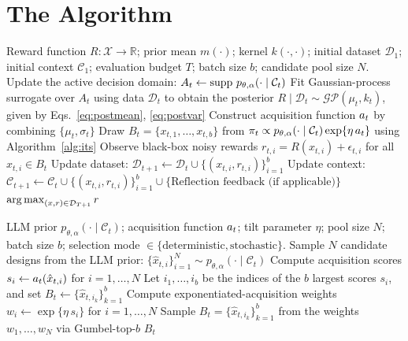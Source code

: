 \section{The Algorithm}
\label{sec:algo}

\begin{algorithm}[t]
\caption{The Large Discovery Model Loop}
\label{alg:ldm_sequential}
\begin{algorithmic}[1]
\Require Reward function $R:\mathcal{X}\to\mathbb{R}$; prior mean $m(\cdot)$; kernel $k(\cdot,\cdot)$; initial dataset $\mathcal{D}_1$; initial context $\mathcal{C}_1$; evaluation budget $T$; batch size $b$; candidate pool size $N$.
  \State Update the active decision domain: $A_t \gets \operatorname{supp}\,p_{\theta,\alpha}(\cdot\mid\mathcal{C}_t)$
  \State Fit Gaussian-process surrogate over $A_t$ using data $\mathcal{D}_t$ to obtain the posterior $R \mid \mathcal{D}_t \sim \mathcal{GP}(\mu_t, k_t)$, given by Eqs.~\eqref{eq:postmean}, \eqref{eq:postvar} 
  \State Construct acquisition function $a_t$ by combining $\{\mu_t, \sigma_t\}$ 
  \State Draw $B_t = \{x_{t,1},\dots,x_{t,b}\}$ from $\pi_t \propto p_{\theta,\alpha}(\cdot\mid\mathcal{C}_t)\exp\{\eta\,a_t\}$ using Algorithm~\ref{alg:its}
  \State Observe black-box noisy rewards $r_{t,i} = R(x_{t,i}) + \epsilon_{t,i}$ for all $x_{t,i} \in B_t$
  \State Update dataset: $\mathcal{D}_{t+1} \gets \mathcal{D}_t \cup \{(x_{t,i}, r_{t,i})\}_{i=1}^b$
  \State Update context: $\mathcal{C}_{t+1} \gets \mathcal{C}_t \cup \{(x_{t,i}, r_{t,i})\}_{i=1}^b \cup \{\text{Reflection feedback (if applicable)}\}$
\EndFor
\State \Return $\operatorname*{arg\,max}_{(x,r) \in \mathcal{D}_{T+1}} r$
\end{algorithmic}
\end{algorithm}

\begin{algorithm}[t]
\caption{Acquisition-Guided Inference-time Sampling}
\label{alg:its}
\begin{algorithmic}[1]
\Require LLM prior $p_{\theta,\alpha}(\cdot \mid \mathcal{C}_t)$; acquisition function $a_t$; tilt parameter $\eta$; pool size $N$; batch size $b$; selection mode $\in \{\text{deterministic}, \text{stochastic}\}$.
\State Sample $N$ candidate designs from the LLM prior: $\{\hat{x}_{t,i}\}_{i=1}^N \sim p_{\theta, \alpha}(\cdot \mid \mathcal{C}_t)$
\State Compute acquisition scores $s_i \gets a_t(\hat{x}_{t,i})$ for $i=1,\dots,N$
  \State Let $i_1,\dots,i_b$ be the indices of the $b$ largest scores $s_i$, and set $B_t \gets \{\hat{x}_{t,i_k}\}_{k=1}^{b}$ 
  \State Compute exponentiated-acquisition weights $w_i \gets \exp\{\eta\, s_i\}$ for $i=1,\dots,N$
  \State Sample $B_t = \{\hat{x}_{t,i_k}\}_{k=1}^{b}$ from the weights $w_1,\dots,w_N$ via Gumbel-top-$b$ 
\EndIf
\State \Return $B_t$
\end{algorithmic}
\end{algorithm}

